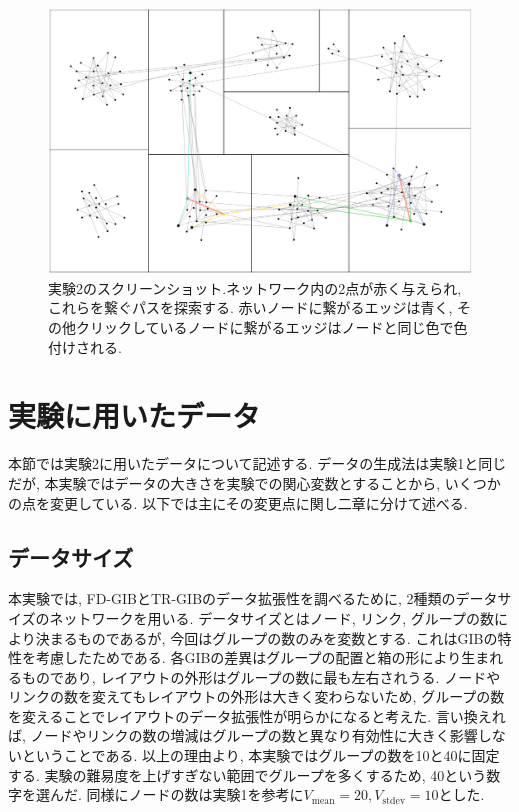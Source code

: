 \documentclass{kuee}
\begin{document}
\begin{figure}[t]
  \begin{center}
  \includegraphics[width=15cm]{./images/ex2-screenshot.png}
  \caption{実験2のスクリーンショット.ネットワーク内の2点が赤く与えられ, これらを繋ぐパスを探索する. 赤いノードに繋がるエッジは青く, その他クリックしているノードに繋がるエッジはノードと同じ色で色付けされる. \label{fig:screenshot-ex2}}
  \end{center}
\end{figure}

\section{実験に用いたデータ}
\label{sec:data_ex2}
本節では実験2に用いたデータについて記述する.
データの生成法は実験1と同じだが, 本実験ではデータの大きさを実験での関心変数とすることから, いくつかの点を変更している.
以下では主にその変更点に関し二章に分けて述べる.

\subsection{データサイズ}
\label{subsec:data_size}
本実験では, FD-GIBとTR-GIBのデータ拡張性を調べるために, 2種類のデータサイズのネットワークを用いる.
データサイズとはノード, リンク, グループの数により決まるものであるが, 今回はグループの数のみを変数とする.
これはGIBの特性を考慮したためである.
各GIBの差異はグループの配置と箱の形により生まれるものであり, レイアウトの外形はグループの数に最も左右されうる.
ノードやリンクの数を変えてもレイアウトの外形は大きく変わらないため, グループの数を変えることでレイアウトのデータ拡張性が明らかになると考えた.
言い換えれば, ノードやリンクの数の増減はグループの数と異なり有効性に大きく影響しないということである.
以上の理由より, 本実験ではグループの数を10と40に固定する.
実験の難易度を上げすぎない範囲でグループを多くするため, 40という数字を選んだ.
同様にノードの数は実験1を参考に$V_{\text{mean}} = 20, V_{\text{stdev}} = 10$とした.
\end{document}
